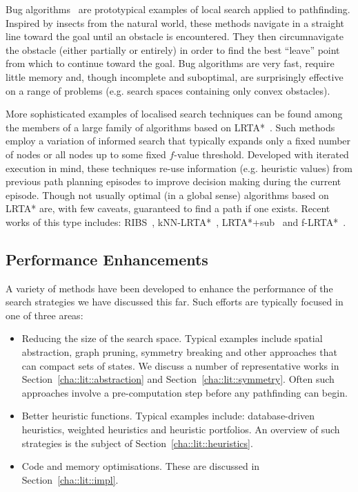 Bug algorithms~\citep{choset05} are prototypical examples of local search
applied to pathfinding.  Inspired by insects from
the natural world, these methods navigate in a straight line toward the goal
until an obstacle is encountered. They then circumnavigate the obstacle
(either partially or entirely) in order to find the best ``leave'' point from
which to continue toward the goal.  Bug algorithms are very fast, require
little memory and, though incomplete and suboptimal, are surprisingly
effective on a range of problems (e.g. search spaces containing only convex
obstacles).

More sophisticated examples of localised search techniques can be found among
the members of a large family of algorithms based on
LRTA{*}~\citep{DBLP:journals/ai/Korf90}. Such methods employ a variation of 
informed search that typically expands only a fixed number of
nodes or all nodes up to some fixed $f$-value threshold.  Developed with
iterated execution in mind, these techniques re-use information (e.g. heuristic
values) from previous path planning episodes to improve decision making during
the current episode. Though not usually optimal (in a global sense) algorithms 
based on LRTA{*} are, with few caveats, guaranteed to find a path if one exists. 
Recent works of this type includes:
RIBS~\citep{DBLP:conf/atal/SturtevantBB10},
kNN-LRTA{*}~\citep{DBLP:journals/jair/BulitkoBL10}, 
LRTA{*}+sub~\citep{DBLP:conf/aips/HernandezB11} and 
f-LRTA{*}~\citep{DBLP:conf/ijcai/SturtevantB11}.

\subsection{Performance Enhancements}
\label{cha::lit::search::impl}
A variety of methods have been developed to enhance the performance of the
search strategies we have discussed this far. Such efforts are typically focused
in one of three areas:

\begin{itemize}
\item Reducing the size of the search space.
Typical examples include spatial abstraction, graph pruning, 
symmetry breaking and other approaches that can compact sets of states.
We discuss a number of representative works in Section~\ref{cha::lit::abstraction}
and Section~\ref{cha::lit::symmetry}. Often such approaches involve a 
pre-computation step before any pathfinding can begin.

\item Better heuristic functions.
Typical examples include: database-driven heuristics, weighted heuristics and 
heuristic portfolios. An overview of such strategies is the subject of 
Section~\ref{cha::lit::heuristics}.

\item Code and memory optimisations. These are discussed in 
Section~\ref{cha::lit::impl}.
\end{itemize}

